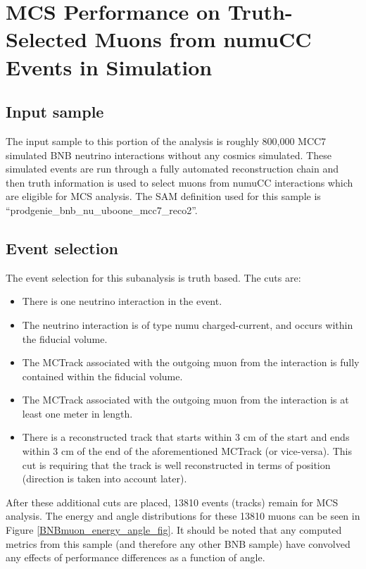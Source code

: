 \section{MCS Performance on Truth-Selected Muons from numuCC Events in Simulation}\label{MCBNBRecoTrack_performance_section}

\subsection{Input sample}\label{MCBNBRecoTrack_input_sample_section}
The input sample to this portion of the analysis is roughly 800,000 MCC7 simulated BNB neutrino interactions without any cosmics simulated. These simulated events are run through a fully automated reconstruction chain and then truth information is used to select muons from numuCC interactions which are eligible for MCS analysis. The SAM definition used for this sample is ``prodgenie\_bnb\_nu\_uboone\_mcc7\_reco2''.

\subsection{Event selection}\label{MCBNBRecoTrack_eventselection_section}
The event selection for this subanalysis is truth based. The cuts are:
\begin{itemize}
\item There is one neutrino interaction in the event.
\item The neutrino interaction is of type numu charged-current, and occurs within the fiducial volume.
\item The {\sc MCTrack} associated with the outgoing muon from the interaction is fully contained within the fiducial volume.
\item The {\sc MCTrack} associated with the outgoing muon from the interaction is at least one meter in length.
\item There is a reconstructed track that starts within 3 cm of the start and ends within 3 cm of the end of the aforementioned {\sc MCTrack} (or vice-versa). This cut is requiring that the track is well reconstructed in terms of position (direction is taken into account later).
\end{itemize}
After these additional cuts are placed, 13810 events (tracks) remain for MCS analysis. The energy and angle distributions for these 13810 muons can be seen in Figure \ref{BNBmuon_energy_angle_fig}. It should be noted that any computed metrics from this sample (and therefore any other BNB sample) have convolved any effects of performance differences as a function of angle.\\

